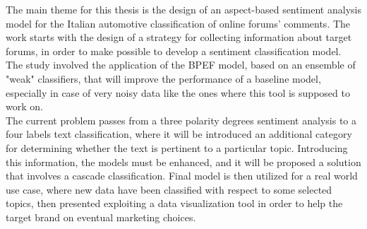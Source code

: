 
The main theme for this thesis is the design of an aspect-based sentiment analysis model for the Italian automotive classification of online forums' comments. The work starts with the design of a strategy for collecting information about target forums, in order to make possible to develop a sentiment classification model. The study involved the application of the BPEF model, based on an ensemble of "weak" classifiers, that will improve the performance of a baseline model, especially in case of very noisy data like the ones where this tool is supposed to work on.\\
The current problem passes from a three polarity degrees sentiment analysis to a four labels text classification, where it will be introduced an additional category for determining whether the text is pertinent to a particular topic. Introducing this information, the models must be enhanced, and it will be proposed a solution that involves a cascade classification. Final model is then utilized for a real world use case, where new data have been classified with respect to some selected topics, then presented exploiting a data visualization tool in order to help the target brand on eventual marketing choices.